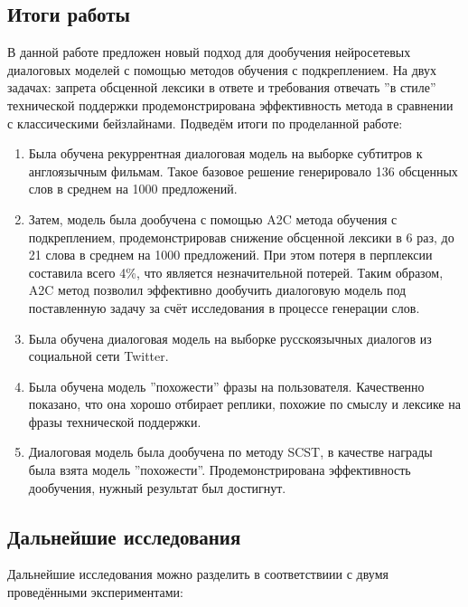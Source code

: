 \documentclass[12pt,a4paper]{amsart}
\begin{document}
\subsection{Итоги работы}
В данной работе предложен новый подход для дообучения нейросетевых диалоговых моделей с помощью методов обучения с подкреплением. На двух задачах: запрета обсценной лексики в ответе и требования отвечать ''в стиле'' технической поддержки продемонстрирована эффективность метода в сравнении с классическими бейзлайнами. Подведём итоги по проделанной работе:

\begin{enumerate}
	\item Была обучена рекуррентная диалоговая модель на выборке субтитров к англоязычным фильмам. Такое базовое решение генерировало 136 обсценных слов в среднем на 1000 предложений. 
	\item Затем, модель была дообучена с помощью A2C метода обучения с подкреплением, продемонстрировав снижение обсценной лексики в 6 раз, до 21 слова в среднем на 1000 предложений. При этом потеря в перплексии составила всего 4\%, что является незначительной потерей. Таким образом, A2C метод позволил эффективно дообучить диалоговую модель под поставленную задачу за счёт исследования в процессе генерации слов.
	\item Была обучена диалоговая модель на выборке русскоязычных диалогов из социальной сети Twitter.
	\item Была обучена модель ''похожести'' фразы на пользователя. Качественно показано, что она хорошо отбирает реплики, похожие по смыслу и лексике на фразы технической поддержки.
	\item Диалоговая модель была дообучена по методу SCST, в качестве награды была взята модель ''похожести''. Продемонстрирована эффективность дообучения, нужный результат был достигнут.
\end{enumerate}

\subsection{Дальнейшие исследования}

Дальнейшие исследования можно разделить в соответствиии с двумя проведёнными экспериментами:
\end{document}
